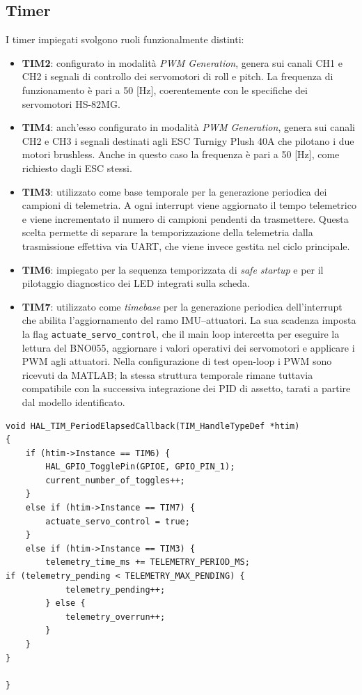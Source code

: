 \documentclass[11pt]{report}
\begin{document}
\subsection{Timer}
I timer impiegati svolgono ruoli funzionalmente distinti:
\begin{itemize}
    \item \textbf{TIM2}: configurato in modalità \textit{PWM Generation}, genera sui canali CH1 e CH2 i segnali di controllo dei servomotori di roll e pitch. La frequenza di funzionamento è pari a 50 [Hz], coerentemente con le specifiche dei servomotori HS-82MG.

    \item \textbf{TIM4}: anch'esso configurato in modalità \textit{PWM Generation}, genera sui canali CH2 e CH3 i segnali destinati agli ESC Turnigy Plush 40A che pilotano i due motori brushless. Anche in questo caso la frequenza è pari a 50 [Hz], come richiesto dagli ESC stessi.

    \item \textbf{TIM3}: utilizzato come base temporale per la generazione periodica dei campioni di telemetria. A ogni interrupt viene aggiornato il tempo telemetrico e viene incrementato il numero di campioni pendenti da trasmettere. Questa scelta permette di separare la temporizzazione della telemetria dalla trasmissione effettiva via UART, che viene invece gestita nel ciclo principale.

    \item \textbf{TIM6}: impiegato per la sequenza temporizzata di \textit{safe startup} e per il pilotaggio diagnostico dei LED integrati sulla scheda.

    \item \textbf{TIM7}: utilizzato come \textit{timebase} per la generazione periodica dell'interrupt che abilita l'aggiornamento del ramo IMU–attuatori. La sua scadenza imposta la flag \texttt{actuate\_servo\_control}, che il main loop intercetta per eseguire la lettura del BNO055, aggiornare i valori operativi dei servomotori e applicare i PWM agli attuatori. Nella configurazione di test open-loop i PWM sono ricevuti da MATLAB; la stessa struttura temporale rimane tuttavia compatibile con la successiva integrazione dei PID di assetto, tarati a partire dal modello identificato.
\end{itemize}

\begin{lstlisting}[caption={Callback periodica dei timer utilizzati per safe startup, ramo IMU–attuatori e telemetria.}, label={lst:nome}]
void HAL_TIM_PeriodElapsedCallback(TIM_HandleTypeDef *htim)
{
    if (htim->Instance == TIM6) {
        HAL_GPIO_TogglePin(GPIOE, GPIO_PIN_1);
        current_number_of_toggles++;
    }
    else if (htim->Instance == TIM7) {
        actuate_servo_control = true;
    }
    else if (htim->Instance == TIM3) {
        telemetry_time_ms += TELEMETRY_PERIOD_MS;
if (telemetry_pending < TELEMETRY_MAX_PENDING) {
            telemetry_pending++;
        } else {
            telemetry_overrun++;
        }
    }
}

}
\end{lstlisting}
\end{document}
